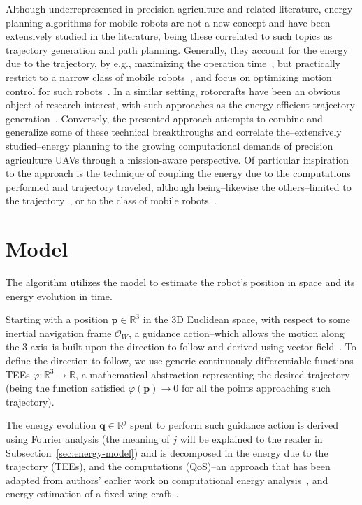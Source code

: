 \documentclass[letterpaper,10pt,conference]{ieeeconf}
\begin{document}
Although underrepresented in precision agriculture and related literature, energy planning algorithms for mobile robots are not a new concept and have been extensively studied in the literature, being these correlated to such topics as trajectory generation and path planning. Generally, they account for the energy due to the trajectory, by e.g., maximizing the operation time~\cite{wahab2015energy}, but practically restrict to a narrow class of mobile robots~\cite{kim2005energy}, and focus on optimizing motion control for such robots~\cite{kim2008minimum}. In a similar setting, rotorcrafts have been an obvious object of research interest, with such approaches as the energy-efficient trajectory generation~\cite{morbidi2016minimum,kreciglowa2017energy}. Conversely, the presented approach attempts to combine and generalize some of these technical breakthroughs and correlate the--extensively studied--energy planning to the growing computational demands of precision agriculture UAVs through a mission-aware perspective.
Of particular inspiration to the approach is the technique of coupling the energy due to the computations performed and trajectory traveled, although being--likewise the others--limited to the trajectory~\cite{mei2004energy,mei2005case,mei2006deployment}, or to the class of mobile robots~\cite{sadrpour2013mission,sadrpour2013experimental}. 

\section{Model}
\label{sec:model}

The algorithm utilizes the model to estimate the robot's position in space and its energy evolution in time.

Starting with a position $\mathbf{p}\in\mathbb{R}^3$ in the 3D Euclidean space, with respect to some inertial navigation frame $\mathcal{O}_W$, a guidance action--which allows the motion along the 3-axis--is built upon the direction to follow and derived using vector field~\cite{de2017guidance}. To define the direction to follow, we use generic continuously differentiable functions TEEs $\varphi:\mathbb{R}^3\rightarrow\mathbb{R}$, a mathematical abstraction representing the desired trajectory (being the function satisfied $\varphi(\mathbf{p})\rightarrow 0$ for all the points approaching such trajectory).

The energy evolution $\mathbf{q}\in\mathbb{R}^j$ spent to perform such guidance action is derived using Fourier analysis (the meaning of $j$ will be explained to the reader in Subsection~\ref{sec:energy-model}) and is decomposed in the energy due to the trajectory (TEEs), and the computations (QoS)--an approach that has been adapted from authors' earlier work on computational energy analysis~\cite{seewald2019coarse, seewald2019component}, and energy estimation of a fixed-wing craft~\cite{seewald2020mechanical}.
\end{document}
